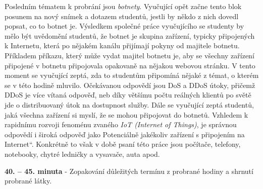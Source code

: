 \documentclass[a4paper, 12pt]{article}
\providecommand{\uv}[1]{\quotedblbase #1\textquotedblleft}
\begin{document}
Posledním tématem k probrání jsou \textit{botnety}. Vyučující opět začne tento blok posunem na nový snímek a dotazem studentů, jestli by někdo z nich dovedl popsat, co to botnet je. Výsledkem společné práce vyučujícího se studenty by mělo být uvědomění studentů, že botnet je skupina zařízení, typicky připojených k Internetu, která po nějakém kanálu přijímají pokyny od majitele botnetu. Příkladem příkazu, který může vydat majitel botnetu je, aby se všechny zařízení připojené v botnetu připojovala opakovaně na nějakou webovou stránku. V tento moment se vyučující zeptá, zda to studentům připomíná nějaké z témat, o kterém se v této hodině mluvilo. Očekávanou odpovědí jsou DoS a DDoS útoky, přičemž DDoS je více vítaná odpověď, neb díky většímu počtu reálných klientů po světě jde o distribuovaný útok na dostupnost služby. Dále se vyučující zeptá studentů, jaká všechna zařízení si myslí, že se mohou připojovat do botnetů. Vzhledem k rapidnímu rozvoji fenoménu zvaného \textit{IoT (Internet of Things)}, je správnou odpovědí i široká odpověď jako \uv{Potenciálně jakékoliv zařízení s připojením na Internet}. Konkrétně to však v době psaní této práce jsou počítače, telefony, notebooky, chytré ledničky a vysavače, auta apod.

\textbf{40. -- 45. minuta} - Zopakování důležitých termínu z probrané hodiny a shrnutí probrané látky.


\end{document}
